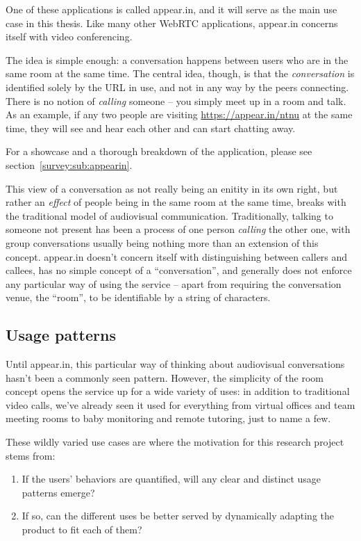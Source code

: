 One of these applications is called appear.in, and it will serve as the main use case in this thesis. Like many other WebRTC applications, appear.in concerns itself with video conferencing.

The idea is simple enough: a conversation happens between users who are in the same room at the same time. The central idea, though, is that the \emph{conversation} is identified solely by the URL in use, and not in any way by the peers connecting. There is no notion of \emph{calling} someone -- you simply meet up in a room and talk. As an example, if any two people are visiting \url{https://appear.in/ntnu} at the same time, they will see and hear each other and can start chatting away.

For a showcase and a thorough breakdown of the application, please see section~\ref{survey:sub:appearin}.

This view of a conversation as not really being an enitity in its own right, but rather an \emph{effect} of people being in the same room at the same time, breaks with the traditional model of audiovisual communication. Traditionally, talking to someone not present has been a process of one person \emph{calling} the other one, with group conversations usually being nothing more than an extension of this concept. appear.in doesn't concern itself with distinguishing between callers and callees, has no simple concept of a ``conversation'', and generally does not enforce any particular way of using the service -- apart from requiring the conversation venue, the ``room'', to be identifiable by a string of characters.

\subsection{Usage patterns}

Until appear.in, this particular way of thinking about audiovisual conversations hasn't been a commonly seen pattern. However, the simplicity of the room concept opens the service up for a wide variety of uses: in addition to traditional video calls, we've already seen it used for everything from virtual offices and team meeting rooms to baby monitoring and remote tutoring, just to name a few.

These wildly varied use cases are where the motivation for this research project stems from:

\begin{enumerate}
  \item If the users' behaviors are quantified, will any clear and distinct usage patterns emerge?
  \item If so, can the different uses be better served by dynamically adapting the product to fit each of them?
\end{enumerate}

